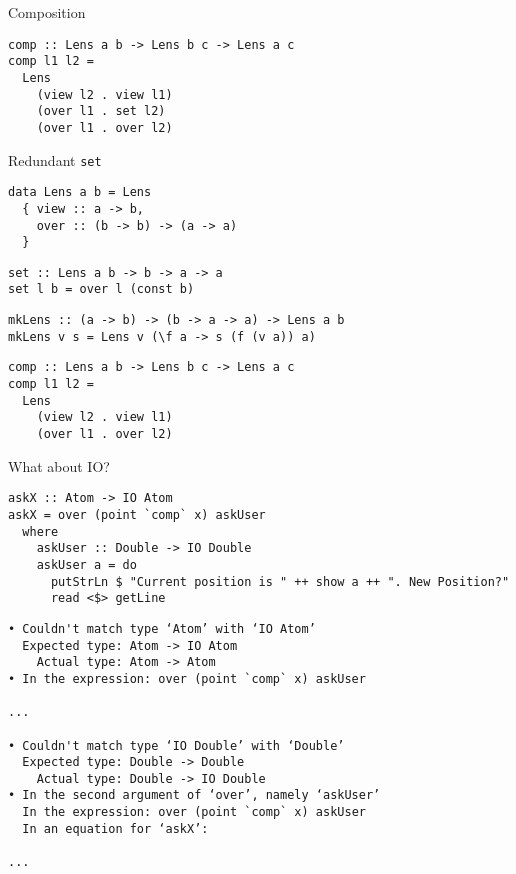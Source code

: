\documentclass[presentation,aspectratio=169,8pt]{beamer}
\begin{document}
\begin{frame}[label={sec:orgc6e42b2},fragile]{Composition}
 \begin{verbatim}
comp :: Lens a b -> Lens b c -> Lens a c
comp l1 l2 =
  Lens
    (view l2 . view l1)
    (over l1 . set l2)
    (over l1 . over l2)
\end{verbatim}
\end{frame}

\begin{frame}[label={sec:org145f9c6},fragile]{Redundant \texttt{set}}
 \begin{verbatim}
data Lens a b = Lens
  { view :: a -> b,
    over :: (b -> b) -> (a -> a)
  }
\end{verbatim}

\pause

\begin{verbatim}
set :: Lens a b -> b -> a -> a
set l b = over l (const b)
\end{verbatim}

\pause

\begin{verbatim}
mkLens :: (a -> b) -> (b -> a -> a) -> Lens a b
mkLens v s = Lens v (\f a -> s (f (v a)) a)
\end{verbatim}

\pause

\begin{verbatim}
comp :: Lens a b -> Lens b c -> Lens a c
comp l1 l2 =
  Lens
    (view l2 . view l1)
    (over l1 . over l2)
\end{verbatim}
\end{frame}

\begin{frame}[label={sec:orgeda7cf3},fragile]{What about IO?}
 \begin{verbatim}
askX :: Atom -> IO Atom
askX = over (point `comp` x) askUser
  where
    askUser :: Double -> IO Double
    askUser a = do
      putStrLn $ "Current position is " ++ show a ++ ". New Position?"
      read <$> getLine
\end{verbatim}

\pause

\begin{verbatim}
• Couldn't match type ‘Atom’ with ‘IO Atom’
  Expected type: Atom -> IO Atom
    Actual type: Atom -> Atom
• In the expression: over (point `comp` x) askUser

...

• Couldn't match type ‘IO Double’ with ‘Double’
  Expected type: Double -> Double
    Actual type: Double -> IO Double
• In the second argument of ‘over’, namely ‘askUser’
  In the expression: over (point `comp` x) askUser
  In an equation for ‘askX’:

...
\end{verbatim}
\end{frame}
\end{document}
